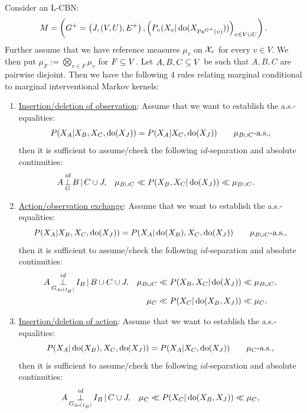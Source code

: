 \begin{Cor}
    \label{cor:as-do-calculus-5}
    Consider an L-CBN:
    \[M= \left ( G^+=\left ( J,(V,U),E^+ \right ), \left ( P_v ( X_v|\operatorname{do}( X_{\mathrm{Pa}^{G^+}(v)})) \right )_{v \in V \cup U} \right ).\]
    Further assume that we have %
    reference measures $\mu_v$ on $\mathcal{X}_v$ for every $v \in V$.
    We then put $\mu_F := \bigotimes_{v \in F} \mu_v$ for $F \subseteq V$.
    Let $A,B,C \subseteq V$ be such that $A,B,C$ are pairwise disjoint.
    Then we have the following 4 rules relating marginal conditional to marginal interventional Markov kernels:
    \begin{enumerate}
        \item \underline{Insertion/deletion of observation}:
          Assume that we want to establish the a.s.-equalities:
          \[ P(X_A|X_B,X_C,\operatorname{do}(X_J)) = P(X_A|X_C,\operatorname{do}(X_J)) \qquad \mu_{B \cup C}\text{-a.s.}, \]
         then it is sufficient to assume/check the following $id$-separation and absolute continuities:
         \begin{align*} 
             A &\operatorname*{\perp}^{id}_{G} B \operatorname*{|} C \cup J, &
             \mu_{B \cup C} &\ll P(X_B,X_C|\operatorname{do}(X_J))\ll \mu_{B \cup C}.
         \end{align*}
     \item \underline{Action/observation exchange}: 
       Assume that we want to establish the a.s.-equalities:
        \[ P(X_A|X_B,X_C,\operatorname{do}(X_J)) = P(X_A|\operatorname{do}(X_B),X_C,\operatorname{do}(X_J)) \qquad \mu_{B \cup C}\text{-a.s.}, \]
         then it is sufficient to assume/check the following $id$-separation and absolute continuities:
         \begin{align*} 
             A & \operatorname*{\perp}^{id}_{G_{\operatorname{do}(I_B)}} I_B \operatorname*{|} B \cup C \cup J, &          
                    \mu_{B \cup C} &\ll  P(X_B,X_C|\operatorname{do}(X_J)) \ll \mu_{B \cup C},\\
                 &&   \mu_C &\ll  P(X_C|\operatorname{do}(X_B,X_J)) \ll \mu_C.
         \end{align*}
     \item \underline{Insertion/deletion of action}: 
         Assume that we want to establish the a.s.-equalities:
         \[ P(X_A|\operatorname{do}(X_B),X_C,\operatorname{do}(X_J)) = P(X_A|X_C,\operatorname{do}(X_J)) \qquad \mu_C\text{-a.s.}, \]
          then it is sufficient to assume/check the following $id$-separation and absolute continuities:
         \begin{align*} 
             A &\idPerp_{G_{\doit(I_B)}} I_B \given C  \cup J, &          
             \mu_C &\ll P(X_C|\doit(X_B,X_J)) \ll \mu_C, \\

\end{align*}
\end{enumerate}
\end{Cor}
